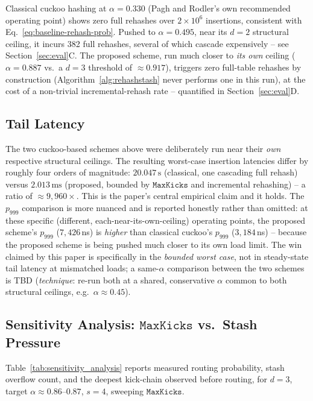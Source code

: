 \documentclass[conference]{IEEEtran}
\begin{document}
	Classical cuckoo hashing at $\alpha=0.330$ (Pagh and Rodler's own
	recommended operating point) shows zero full rehashes over
	$2\times10^6$ insertions, consistent with
	Eq.~\ref{eq:baseline-rehash-prob}. Pushed to $\alpha=0.495$, near its
	$d=2$ structural ceiling, it incurs 382 full rehashes, several of
	which cascade expensively -- see Section~\ref{sec:eval}C. The proposed
	scheme, run much closer to \emph{its own} ceiling
	($\alpha=0.887$ vs.\ a $d=3$ threshold of $\approx0.917$), triggers
	zero full-table rehashes by construction (Algorithm~\ref{alg:rehashstash}
	never performs one in this run), at the cost of a non-trivial
	incremental-rehash rate -- quantified in Section~\ref{sec:eval}D.
	
	\subsection{Tail Latency}
	The two cuckoo-based schemes above were deliberately run near their
	\emph{own} respective structural ceilings. The resulting worst-case
	insertion latencies differ by roughly four orders of magnitude:
	$20.047\,\text{s}$ (classical, one cascading full rehash) versus
	$2.013\,\text{ms}$ (proposed, bounded by $\mathtt{MaxKicks}$ and
	incremental rehashing) -- a ratio of $\approx\!9{,}960\times$. This is
	the paper's central empirical claim and it holds. The $p_{999}$
	comparison is more nuanced and is reported honestly rather than
	omitted: at these specific (different, each-near-its-own-ceiling)
	operating points, the proposed scheme's $p_{999}$ ($7{,}426\,$ns) is
	\emph{higher} than classical cuckoo's $p_{999}$ ($3{,}184\,$ns) --
	because the proposed scheme is being pushed much closer to its own
	load limit. The win claimed by this paper is specifically in the
	\emph{bounded worst case}, not in steady-state tail latency at
	mismatched loads; a same-$\alpha$ comparison between the two schemes
	is TBD (\emph{technique}: re-run both at a shared, conservative
	$\alpha$ common to both structural ceilings, e.g.\ $\alpha\approx0.45$).
	
	\subsection{Sensitivity Analysis: $\mathtt{MaxKicks}$ vs.\ Stash Pressure}
	Table~\ref{tab:sensitivity_analysis} reports measured routing
	probability, stash overflow count, and the deepest kick-chain observed
	before routing, for $d=3$, target $\alpha\approx0.86$--$0.87$, $s=4$,
	sweeping $\mathtt{MaxKicks}$.
	
\end{document}
